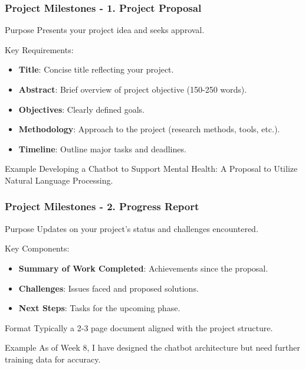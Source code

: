 \documentclass[aspectratio=169]{beamer}
\begin{document}
\begin{frame}[fragile]
    \frametitle{Project Milestones - 1. Project Proposal}
    \begin{block}{Purpose}
        Presents your project idea and seeks approval.
    \end{block}
    Key Requirements:
    \begin{itemize}
        \item \textbf{Title}: Concise title reflecting your project.
        \item \textbf{Abstract}: Brief overview of project objective (150-250 words).
        \item \textbf{Objectives}: Clearly defined goals.
        \item \textbf{Methodology}: Approach to the project (research methods, tools, etc.).
        \item \textbf{Timeline}: Outline major tasks and deadlines.
    \end{itemize}
    \begin{block}{Example}
        Developing a Chatbot to Support Mental Health: A Proposal to Utilize Natural Language Processing.
    \end{block}
\end{frame}

\begin{frame}[fragile]
    \frametitle{Project Milestones - 2. Progress Report}
    \begin{block}{Purpose}
        Updates on your project's status and challenges encountered.
    \end{block}
    Key Components:
    \begin{itemize}
        \item \textbf{Summary of Work Completed}: Achievements since the proposal.
        \item \textbf{Challenges}: Issues faced and proposed solutions.
        \item \textbf{Next Steps}: Tasks for the upcoming phase.
    \end{itemize}
    \begin{block}{Format}
        Typically a 2-3 page document aligned with the project structure.
    \end{block}
    \begin{block}{Example}
        As of Week 8, I have designed the chatbot architecture but need further training data for accuracy.
    \end{block}
\end{frame}
\end{document}

